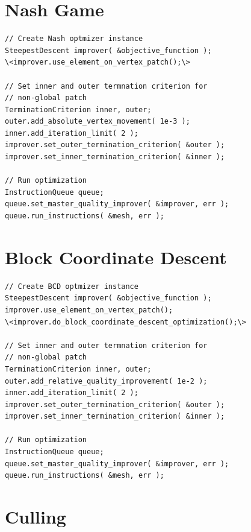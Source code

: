 \section{Nash Game \label{sec:nash} }


\begin{lstlisting}[frame=single]
// Create Nash optmizer instance
SteepestDescent improver( &objective_function );
\<improver.use_element_on_vertex_patch();\>

// Set inner and outer termnation criterion for 
// non-global patch
TerminationCriterion inner, outer;
outer.add_absolute_vertex_movement( 1e-3 );
inner.add_iteration_limit( 2 );
improver.set_outer_termination_criterion( &outer );
improver.set_inner_termination_criterion( &inner );

// Run optimization
InstructionQueue queue;
queue.set_master_quality_improver( &improver, err );
queue.run_instructions( &mesh, err );
\end{lstlisting}


\section{Block Coordinate Descent \label{sec:bcd} }

\begin{lstlisting}[frame=single]
// Create BCD optmizer instance
SteepestDescent improver( &objective_function );
improver.use_element_on_vertex_patch();
\<improver.do_block_coordinate_descent_optimization();\>

// Set inner and outer termnation criterion for 
// non-global patch
TerminationCriterion inner, outer;
outer.add_relative_quality_improvement( 1e-2 );
inner.add_iteration_limit( 2 );
improver.set_outer_termination_criterion( &outer );
improver.set_inner_termination_criterion( &inner );

// Run optimization
InstructionQueue queue;
queue.set_master_quality_improver( &improver, err );
queue.run_instructions( &mesh, err );
\end{lstlisting}


\section{Culling \label{sec:culling}}


